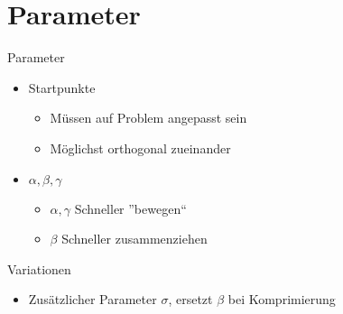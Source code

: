 \section{Parameter} 

\begin{frame}{Parameter}
\begin{itemize}
\item Startpunkte
\begin{itemize}
\item Müssen auf Problem angepasst sein
\item Möglichst orthogonal zueinander
\end{itemize}
\pause \item $\alpha, \beta , \gamma$
\begin{itemize}
\item $\alpha, \gamma$ Schneller ''bewegen`` 
\item $\beta$ Schneller zusammenziehen
\end{itemize}
\end{itemize}
\end{frame}

\begin{frame}{Variationen}
\begin{itemize}
\item Zusätzlicher Parameter $\sigma$, ersetzt $\beta$ bei Komprimierung

\end{itemize}
\end{frame}